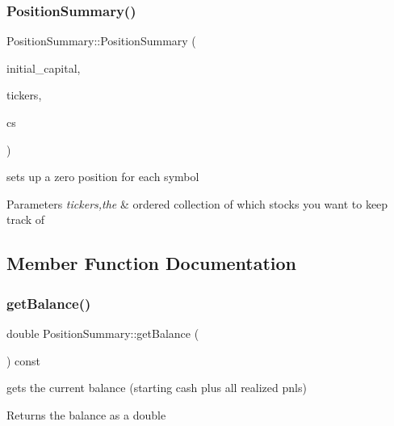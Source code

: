 \subsubsection{\texorpdfstring{Position\+Summary()}{PositionSummary()}}
{\footnotesize\ttfamily Position\+Summary\+::\+Position\+Summary (\begin{DoxyParamCaption}\item[{double}]{initial\+\_\+capital,  }\item[{const std\+::vector$<$ std\+::string $>$ \&}]{tickers,  }\item[{\hyperlink{pnl__calculator_8h_ad733a3c57302a7ac3408d55dc65f2681}{Commission\+Style}}]{cs }\end{DoxyParamCaption})}



sets up a zero position for each symbol 


\begin{DoxyParams}{Parameters}
{\em tickers,the} & ordered collection of which stocks you want to keep track of \\
\hline
\end{DoxyParams}


\subsection{Member Function Documentation}
\mbox{\label{classPositionSummary_a1c8772fe401f8d00de795ff09b856d44}} 
\subsubsection{\texorpdfstring{get\+Balance()}{getBalance()}}
{\footnotesize\ttfamily double Position\+Summary\+::get\+Balance (\begin{DoxyParamCaption}{ }\end{DoxyParamCaption}) const}



gets the current balance (starting cash plus all realized pnls) 

\begin{DoxyReturn}{Returns}
the balance as a double 
\end{DoxyReturn}
\mbox{\label{classPositionSummary_acb0534c73c95999d2ff2739caedf0773}} 
